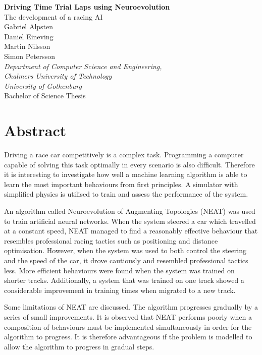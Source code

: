 \thispagestyle{plain}			%
\setlength{\parskip}{0pt}

\noindent
{\large \textbf{Driving Time Trial Laps using Neuroevolution}}\\
{\large The development of a racing AI}\\

\noindent
{\large Gabriel Alpsten}\\
{\large Daniel Eineving}\\
{\large Martin Nilsson}\\
{\large Simon Petersson}\\
\textit{Department of Computer Science and Engineering,}\\
\textit{Chalmers University of Technology}\\
\textit{University of Gothenburg}\\

\noindent
Bachelor of Science Thesis

\section*{\centering Abstract}

Driving a race car competitively is a complex task. Programming a computer capable of solving this task optimally in every scenario is also difficult. Therefore it is interesting to investigate how well a machine learning algorithm is able to learn the most important behaviours from first principles. A simulator with simplified physics is utilised to train and assess the performance of the system.

An algorithm called Neuroevolution of Augmenting Topologies (NEAT) was used to train artificial neural networks. When the system steered a car which travelled at a constant speed, NEAT managed to find a reasonably effective behaviour that resembles professional racing tactics such as positioning and distance optimisation. However, when the system was used to both control the steering and the speed of the car, it drove cautiously and resembled professional tactics less. More efficient behaviours were found when the system was trained on shorter tracks. Additionally, a system that was trained on one track showed a considerable improvement in training times when migrated to a new track. 

Some limitations of NEAT are discussed. The algorithm progresses gradually by a series of small improvements. It is observed that NEAT performs poorly when a composition of behaviours must be implemented simultaneously in order for the algorithm to progress. It is therefore advantageous if the problem is modelled to allow the algorithm to progress in gradual steps. 

